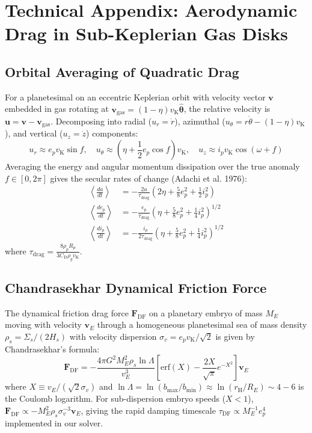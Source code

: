 \documentclass[11pt,a4paper]{article}
\begin{document}
\appendix
\section{Technical Appendix: Aerodynamic Drag in Sub-Keplerian Gas Disks}
\subsection{Orbital Averaging of Quadratic Drag}
For a planetesimal on an eccentric Keplerian orbit with velocity vector $\mathbf{v}$ embedded in gas rotating at $\mathbf{v}_{\text{gas}} = (1 - \eta) v_{\text{K}} \hat{\boldsymbol{\theta}}$, the relative velocity is $\mathbf{u} = \mathbf{v} - \mathbf{v}_{\text{gas}}$. Decomposing into radial ($u_r = \dot{r}$), azimuthal ($u_\theta = r\dot{\theta} - (1-\eta)v_{\text{K}}$), and vertical ($u_z = \dot{z}$) components:
\begin{equation}
u_r \approx e_p v_{\text{K}} \sin f, \quad u_\theta \approx \left(\eta + \frac{1}{2} e_p \cos f\right) v_{\text{K}}, \quad u_z \approx i_p v_{\text{K}} \cos(\omega + f)
\end{equation}
Averaging the energy and angular momentum dissipation over the true anomaly $f \in [0, 2\pi]$ gives the secular rates of change (Adachi et al. 1976):
\begin{align}
\left\langle \frac{da}{dt} \right\rangle &= -\frac{2 a}{\tau_{\text{drag}}} \left( 2\eta + \frac{5}{8}e_p^2 + \frac{1}{2}i_p^2 \right) \\
\left\langle \frac{de_p}{dt} \right\rangle &= -\frac{e_p}{\tau_{\text{drag}}} \left( \eta + \frac{5}{8}e_p^2 + \frac{1}{4}i_p^2 \right)^{1/2} \\
\left\langle \frac{di_p}{dt} \right\rangle &= -\frac{i_p}{2\tau_{\text{drag}}} \left( \eta + \frac{5}{8}e_p^2 + \frac{1}{4}i_p^2 \right)^{1/2}
\end{align}
where $\tau_{\text{drag}} = \frac{8 \rho_p R_p}{3 C_{\text{D}} \rho_g v_{\text{K}}}$.

\subsection{Chandrasekhar Dynamical Friction Force}
The dynamical friction drag force $\mathbf{F}_{\text{DF}}$ on a planetary embryo of mass $M_E$ moving with velocity $\mathbf{v}_E$ through a homogeneous planetesimal sea of mass density $\rho_s = \Sigma_s / (2 H_s)$ with velocity dispersion $\sigma_v = e_p v_{\text{K}} / \sqrt{2}$ is given by Chandrasekhar's formula:
\begin{equation}
\mathbf{F}_{\text{DF}} = -\frac{4\pi G^2 M_E^2 \rho_s \ln\Lambda}{v_E^3} \left[ \mathrm{erf}(X) - \frac{2X}{\sqrt{\pi}} e^{-X^2} \right] \mathbf{v}_E
\end{equation}
where $X \equiv v_E / (\sqrt{2}\sigma_v)$ and $\ln\Lambda = \ln(b_{\max}/b_{\min}) \approx \ln(r_{\text{H}} / R_E) \sim 4-6$ is the Coulomb logarithm. For sub-dispersion embryo speeds ($X < 1$), $\mathbf{F}_{\text{DF}} \propto -M_E^2 \rho_s \sigma_v^{-3} \mathbf{v}_E$, giving the rapid damping timescale $\tau_{\text{DF}} \propto M_E^{-1} e_p^4$ implemented in our solver.
\end{document}
